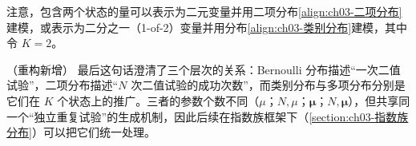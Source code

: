 \documentclass[../../main.tex]{subfiles}
\begin{document}
注意，包含两个状态的量可以表示为二元变量并用二项分布\eqref{align:ch03-二项分布}建模，或表示为二分之一（1-of-2）变量并用分布\eqref{align:ch03-类别分布}建模，其中令 $K=2$。

\begin{remark}（重构新增）
最后这句话澄清了三个层次的关系：Bernoulli 分布描述“一次二值试验”，二项分布描述“$N$ 次二值试验的成功次数”，而类别分布与多项分布分别是它们在 $K$ 个状态上的推广。三者的参数个数不同（$\mu$；$N,\mu$；$\boldsymbol{\mu}$；$N,\boldsymbol{\mu}$），但共享同一个“独立重复试验”的生成机制，因此后续在指数族框架下（\cref{section:ch03-指数族分布}）可以把它们统一处理。
\end{remark}
\end{document}
